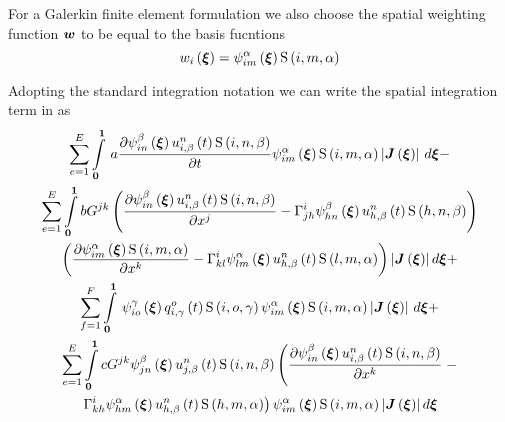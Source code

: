 For a Galerkin finite element formulation we also choose the spatial weighting
function $\vect{w}$ to be equal to the basis fucntions \ie
\begin{equation}
  \fnof{w_{i}}{\vect{\xi}}=\idxgbfn{i}{m}{\alpha}{\vect{\xi}}\idxgsf{i}{m}{\alpha}
\end{equation}


Adopting the standard integration notation we can write the spatial
integration term in  as
\begin{multline}
  \dsum_{e=1}^{E}\gint{\vect{0}}{\vect{1}}{a\delby{\idxgbfn{i}{n}{\beta}{\vect{\xi}}
      \fnof{\idxnodedof{u}{i}{n}{\beta}}{t}\idxgsf{i}{n}{\beta}}{t}
    \idxgbfn{i}{m}{\alpha}{\vect{\xi}}\idxgsf{i}{m}{\alpha}
    \abs{\fnof{\matr{J}}{\vect{\xi}}}}{\vect{\xi}}- \\
  \dsum_{e=1}^{E}\dintl{\vect{0}}{\vect{1}}bG^{jk}\pbrac{\delby{\idxgbfn{i}{n}{\beta}{\vect{\xi}}
        \fnof{\idxnodedof{u}{i}{n}{\beta}}{t}\idxgsf{i}{n}{\beta}}{x^{j}}-
      \christoffel{i}{j}{h}\idxgbfn{h}{n}{\beta}{\vect{\xi}}
      \fnof{\idxnodedof{u}{h}{n}{\beta}}{t}\idxgsf{h}{n}{\beta}} \\
    \pbrac{\delby{\idxgbfn{i}{m}{\alpha}{\vect{\xi}}\idxgsf{i}{m}{\alpha}}{x^{k}}-
      \christoffel{i}{k}{l}\idxgbfn{l}{m}{\alpha}{\vect{\xi}}
      \fnof{\idxnodedof{u}{h}{n}{\beta}}{t}
      \idxgsf{l}{m}{\alpha}}\abs{\fnof{\matr{J}}{\vect{\xi}}}d\vect{\xi} + \\
  \dsum_{f=1}^{F}\gint{\vect{0}}{\vect{1}}{\idxgbfn{i}{o}{\gamma}{\vect{\xi}}
    \fnof{\idxnodedof{q}{i}{o}{\gamma}}{t}\idxgsf{i}{o}{\gamma}
    \idxgbfn{i}{m}{\alpha}{\vect{\xi}}\idxgsf{i}{m}{\alpha}
    \abs{\fnof{\matr{J}}{\vect{\xi}}}}{\vect{\xi}} + \\
  \dsum_{e=1}^{E}\dintl{\vect{0}}{\vect{1}}cG^{jk}\idxgbfn{j}{n}{\beta}{\vect{\xi}}
  \fnof{\idxnodedof{u}{j}{n}{\beta}}{t}\idxgsf{i}{n}{\beta}
  \pbracr{\delby{\idxgbfn{i}{n}{\beta}{\vect{\xi}}\fnof{\idxnodedof{u}{i}{n}{\beta}}{t}
      \idxgsf{i}{n}{\beta}}{x^{k}}}- \\
    \pbracl{\christoffel{i}{k}{h}\idxgbfn{h}{m}{\alpha}{\vect{\xi}}
    \fnof{\idxnodedof{u}{h}{n}{\beta}}{t}\idxgsf{h}{m}{\alpha}}
  \idxgbfn{i}{m}{\alpha}{\vect{\xi}}\idxgsf{i}{m}{\alpha}
  \abs{\fnof{\matr{J}}{\vect{\xi}}}d\vect{\xi}
  \label{eqn:Burgersfemform}
\end{multline}

